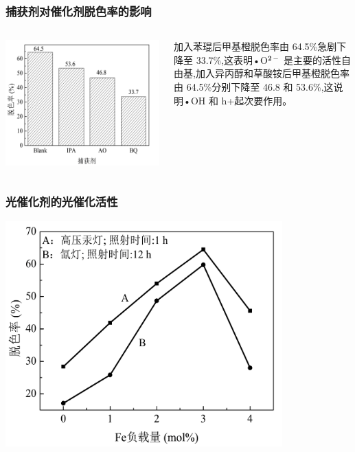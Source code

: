 \documentclass[xetex,compress]{mybeamer}
\begin{document}
\begin{frame}
\frametitle{捕获剂对催化剂脱色率的影响}
\begin{columns}
\begin{block}{}
\centering
\includegraphics[width=\linewidth]{figures/三氧化二铁捕获剂.jpg} 
\end{block}
\begin{block}{}
加入苯琨后甲基橙脱色率由 64.5\%急剧下降至 33.7\%,这表明•O$\mathbf{^{2-}} $ 是主要的活性自由基,加入异丙醇和草酸铵后甲基橙脱色率由 64.5\%分别下降至 46.8 和 53.6\%,这说明•OH 和 h+起次要作用。
\end{block}
\end{columns}
\end{frame}


\begin{frame}
\frametitle{光催化剂的光催化活性}
\begin{block}{}
\centering
\includegraphics[width=0.8\textwidth]{figures/三氧化二铁脱色率一.jpg} 
\end{block}
\end{frame}
\end{document}
